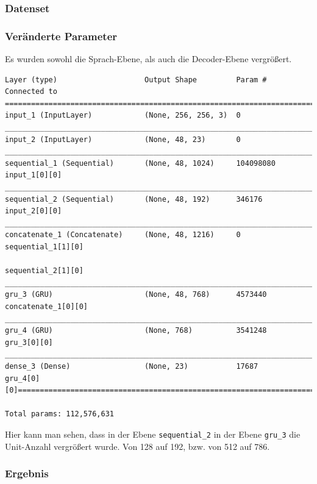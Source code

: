 \documentclass[pdftex,a4paper,halfparskip, article]{scrartcl}
\begin{document}
\subsubsection*{Datenset}

\subsubsection*{Veränderte Parameter}

Es wurden sowohl die Sprach-Ebene, als auch die Decoder-Ebene vergrößert.

\begin{verbatim}
Layer (type)                    Output Shape         Param #     Connected to
=============================================================================
input_1 (InputLayer)            (None, 256, 256, 3)  0
_____________________________________________________________________________
input_2 (InputLayer)            (None, 48, 23)       0
_____________________________________________________________________________
sequential_1 (Sequential)       (None, 48, 1024)     104098080   input_1[0][0]
_____________________________________________________________________________
sequential_2 (Sequential)       (None, 48, 192)      346176      input_2[0][0]
_____________________________________________________________________________
concatenate_1 (Concatenate)     (None, 48, 1216)     0           sequential_1[1][0]
                                                                 sequential_2[1][0]
_____________________________________________________________________________
gru_3 (GRU)                     (None, 48, 768)      4573440     concatenate_1[0][0]
_____________________________________________________________________________
gru_4 (GRU)                     (None, 768)          3541248     gru_3[0][0]
_____________________________________________________________________________
dense_3 (Dense)                 (None, 23)           17687       gru_4[0][0]==========================================================================

Total params: 112,576,631

\end{verbatim}

Hier kann man sehen, dass in der Ebene \texttt{sequential\_2} in der Ebene \texttt{gru\_3} die Unit-Anzahl vergrößert wurde. Von 128 auf 192, bzw. von 512 auf 786.

\subsubsection*{Ergebnis}
\end{document}
